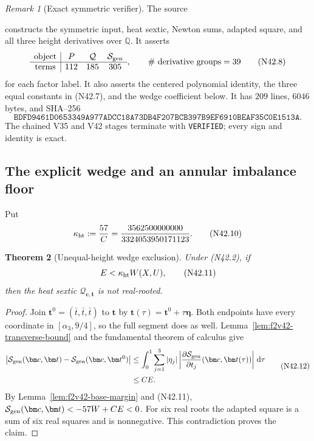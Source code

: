 \documentclass[11pt]{article}
\newtheorem{theorem}{Theorem}[section]
\theoremstyle{definition}
\theoremstyle{remark}
\newtheorem{remark}[theorem]{Remark}
\newcommand{\dd}{\,\mathrm d}
\begin{document}
\begin{remark}[Exact symmetric verifier]
\label{rem:f2v42-verifier}
The source
\begin{center}
\end{center}
constructs the symmetric input, heat sextic, Newton sums, adapted square,
and all three height derivatives over \(\mathbb Q\).  It asserts
\[
\begin{array}{c|ccc}
\text{object}&P&\mathcal Q&\mathcal S_{\rm gen}\\ \hline
\text{terms}&112&185&305
\end{array},
\qquad
\#\text{ derivative groups}=39
\tag{N42.8}
\]
for each factor label.  It also asserts the centered polynomial identity,
the three equal constants in \textup{(N42.7)}, and the wedge coefficient
below.  It has \(209\) lines, \(6046\) bytes, and SHA--256
\[
 \texttt{BDFD9461D0653349A977ADCC18A73DB4}
 \allowbreak\texttt{F207BCB397B9EF6910BEAF35C0E1513A}.
\tag{N42.9}
\]
The chained V35 and V42 stages terminate with \texttt{VERIFIED}; every
sign and identity is exact.
\end{remark}

\subsection{The explicit wedge and an annular imbalance floor}

Put
\[
 \kappa_{\rm ht}:=\frac{57}{C}
 =\frac{3562500000000}{3324053950171123}.
\tag{N42.10}
\]

\begin{theorem}[Unequal-height wedge exclusion]
\label{thm:f2v42-wedge}
Under \textup{(N42.2)}, if
\[
 E<\kappa_{\rm ht}W(X,U),
\tag{N42.11}
\]
then the heat sextic
\(\mathcal Q_{\bm c,\bm t}\) is not real-rooted.
\end{theorem}

\begin{proof}
Join \(\bm t^0=(\bar t,\bar t,\bar t)\) to \(\bm t\) by
\(\bm t(\tau)=\bm t^0+\tau\bm\eta\).  Both endpoints have every
coordinate in \([\alpha_3,9/4]\), so the full segment does as well.
Lemma~\ref{lem:f2v42-transverse-bound} and the fundamental theorem of
calculus give
\[
\begin{aligned}
\left|\mathcal S_{\rm gen}(\bm c,\bm t)
-\mathcal S_{\rm gen}(\bm c,\bm t^0)\right|
&\leq
\int_0^1\sum_{j=1}^3
|\eta_j|
\left|\frac{\partial\mathcal S_{\rm gen}}
{\partial t_j}(\bm c,\bm t(\tau))\right|\dd\tau\\
&\leq CE.
\end{aligned}
\tag{N42.12}
\]
By Lemma~\ref{lem:f2v42-base-margin} and
\textup{(N42.11)},
\(\mathcal S_{\rm gen}(\bm c,\bm t)<-57W+CE<0\).
For six real roots the adapted square is a sum of six real squares and is
nonnegative.  This contradiction proves the claim.
\end{proof}
\end{document}
